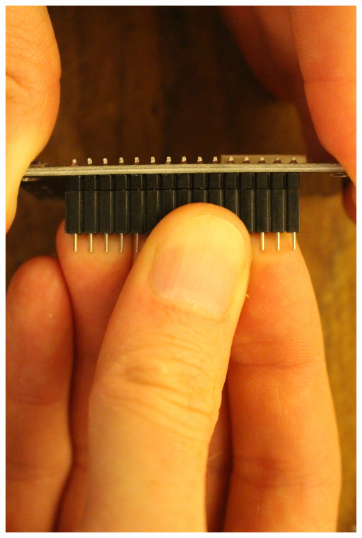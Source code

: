 \documentclass{article}
\begin{document}
\begin{minipage}[b]{0.5\textwidth}
	\includegraphics[width=\textwidth]{Bilder2019/IMG_6457.JPG}
\end{minipage}

\vspace{0.5cm}
\end{document}
